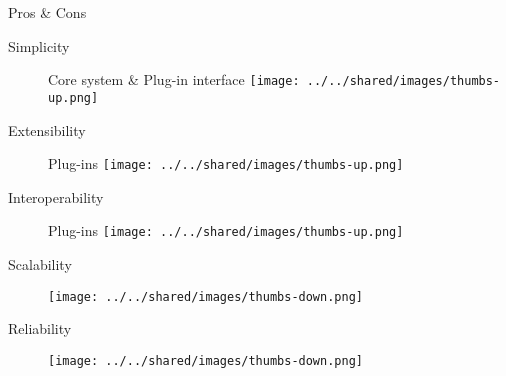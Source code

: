 \documentclass{slide}
\begin{document}
\begin{frame}{Pros \& Cons}
    \vspace{1mm}
    {\huge
    \begin{description}
        \item[Simplicity] Core system \& Plug-in interface \tabto{15em}\texttt{[image: ../../shared/images/thumbs-up.png]}
        \item[Extensibility] Plug-ins \tabto{15em}\texttt{[image: ../../shared/images/thumbs-up.png]}
        \item[Interoperability] Plug-ins \tabto{15em}\texttt{[image: ../../shared/images/thumbs-up.png]}
        \item[Scalability] \tabto{15em}\texttt{[image: ../../shared/images/thumbs-down.png]}
        \item[Reliability] \tabto{15em}\texttt{[image: ../../shared/images/thumbs-down.png]}
    \end{description}
    }
\end{frame}
\end{document}
